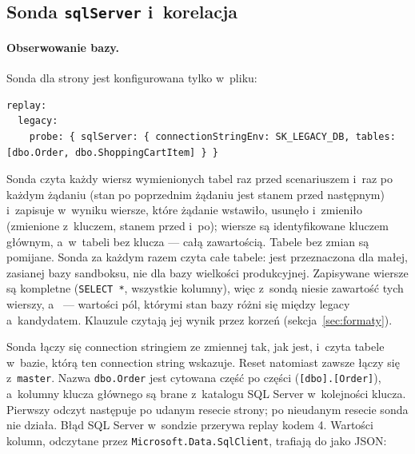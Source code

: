
\subsection{Sonda \texttt{sqlServer} i~korelacja}\label{sec:cli-sonda}

\paragraph{Obserwowanie bazy.} Sonda dla strony jest konfigurowana tylko w~pliku:

\begin{lstlisting}
replay:
  legacy:
    probe: { sqlServer: { connectionStringEnv: SK_LEGACY_DB, tables: [dbo.Order, dbo.ShoppingCartItem] } }
\end{lstlisting}

Sonda czyta każdy wiersz wymienionych tabel raz przed scenariuszem i~raz po każdym żądaniu
(stan po poprzednim żądaniu jest stanem przed następnym) i~zapisuje w~wyniku wiersze, które żądanie wstawiło, usunęło i~zmieniło (zmienione z~kluczem, stanem
przed i~po); wiersze są identyfikowane kluczem głównym, a~w~tabeli bez klucza --- całą
zawartością. Tabele bez zmian są pomijane. Sonda za każdym razem czyta całe tabele: jest
przeznaczona dla małej, zasianej bazy sandboksu, nie dla bazy wielkości produkcyjnej.
Zapisywane wiersze są kompletne (\texttt{SELECT *}, wszystkie kolumny), więc
 z~sondą niesie zawartość tych wierszy, a~ ---
wartości pól, którymi stan bazy różni się między legacy a~kandydatem.
Klauzule czytają jej wynik przez korzeń  (sekcja~\ref{sec:formaty}).

Sonda łączy się connection stringiem ze zmiennej  tak, jak
jest, i~czyta tabele w~bazie, którą ten connection string wskazuje. Reset natomiast zawsze
łączy się z~\texttt{master}. Nazwa \texttt{dbo.Order} jest cytowana część po części
(\texttt{[dbo].[Order]}), a~kolumny klucza głównego są brane z~katalogu SQL Server
w~kolejności klucza. Pierwszy odczyt następuje po udanym resecie strony; po nieudanym resecie
sonda nie działa. Błąd SQL Server w~sondzie przerywa replay kodem 4. Wartości kolumn,
odczytane przez \texttt{Microsoft.Data.SqlClient}, trafiają do  jako JSON:

